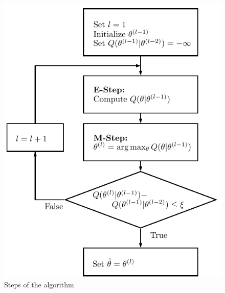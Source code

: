 \begin{figure}
\centering
\includegraphics{data/figures/em-flowchart}
\caption{Steps of the  algorithm}
\end{figure}

